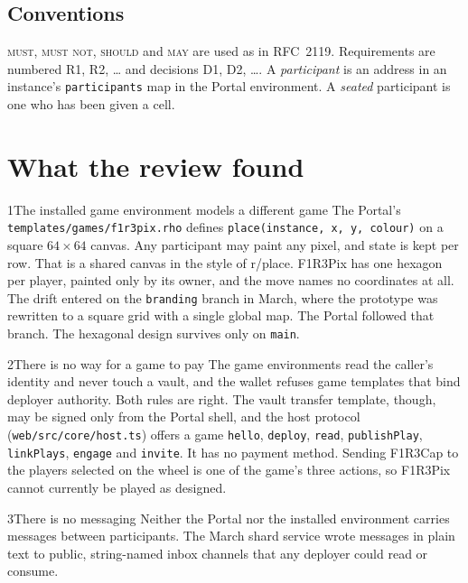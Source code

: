 \documentclass[11pt,a4paper]{article}
\newcommand{\code}[1]{\texttt{#1}}
\newcommand{\MUST}{\textsc{must}}
\newcommand{\MUSTNOT}{\textsc{must not}}
\newcommand{\SHOULD}{\textsc{should}}
\newcommand{\MAY}{\textsc{may}}
\begin{document}
\subsection{Conventions}

\MUST, \MUSTNOT, \SHOULD{} and \MAY{} are used as in RFC~2119. Requirements are numbered
R1, R2, \ldots{} and decisions D1, D2, \ldots. A \emph{participant} is an address in an
instance's \code{participants} map in the Portal environment. A \emph{seated} participant is
one who has been given a cell.

\section{What the review found}\label{sec:findings}

\begin{finding}{1}{The installed game environment models a different game}
The Portal's \code{templates/games/f1r3pix.rho} defines \code{place(instance, x, y, colour)}
on a square $64\times64$ canvas. Any participant may paint any pixel, and state is kept per row.
That is a shared canvas in the style of r/place. F1R3Pix has one hexagon per player, painted
only by its owner, and the move names no coordinates at all. The drift entered on the
\code{branding} branch in March, where the prototype was rewritten to a square grid with a
single global map. The Portal followed that branch. The hexagonal design survives only on
\code{main}.
\end{finding}

\begin{finding}{2}{There is no way for a game to pay}
The game environments read the caller's identity and never touch a vault, and the wallet
refuses game templates that bind deployer authority. Both rules are right. The vault transfer
template, though, may be signed only from the Portal shell, and the host protocol
(\code{web/src/core/host.ts}) offers a game \code{hello}, \code{deploy}, \code{read},
\code{publishPlay}, \code{linkPlays}, \code{engage} and \code{invite}. It has no payment
method. Sending F1R3Cap to the players selected on the wheel is one of the game's three
actions, so F1R3Pix cannot currently be played as designed.
\end{finding}

\begin{finding}{3}{There is no messaging}
Neither the Portal nor the installed environment carries messages between participants. The
March shard service wrote messages in plain text to public, string-named inbox channels that
any deployer could read or consume.
\end{finding}
\end{document}
